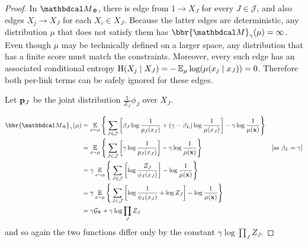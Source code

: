 \begin{proof}
	In $\PDGof{\Phi}$, there is edge from $1 \to X_J$ for every $J \in \mathcal J$, and also edges $X_j \to X_J$ for each $X_i \in X_J$. Because the latter edges are deterministic, any distribution $\mu$ that does not satisfy them has $\bbr{\dg M}_\gamma(\mu) = \infty$. Even though $\mu$ may be technically defined on a larger space, any distribution that has a finite score must match the constraints. Moreover, every such edge has an associated conditional entropy $\operatorname{\mathrm{H}}(X_j \mid X_J) = -\operatorname*{\mathbb{E}}_\mu\log(\mu(x_j \mid x_J)) = 0$. Therefore both per-link terms can be safely ignored for these edges.

	Let $\mathbf{p}_J$ be the joint distribution $\frac{1}{Z_J}\phi_J$ over $X_J$.

	\begin{align*}
	\bbr{\PDGof{\Phi}}_\gamma(\mu) &= \E_{ x \sim \mu} \Bigg\{   \sum_{ J \in \mathcal J } \left[
		\beta_J \log \frac{1}{ p_J(x_J) } + (\gamma - \beta_L ) \log \frac{1}{\mu(x_J)} \right] - \gamma \log \frac{1}{\mu(\mat x)} \Bigg\} \\
		&= \E_{ x \sim \mu} \Bigg\{  \sum_{ J \in \mathcal J }\left[
			\gamma \log \frac{1}{p_J(x_J)}  \right] - \gamma \log \frac{1}{\mu(\mat x)} \Bigg\} 
					&\text{[as $\beta_L = \gamma$]}\\
		&= \gamma \E_{x \sim \mu} \Bigg\{  \sum_{ J \in \mathcal J } \left[
			\log \frac{Z_J}{\phi_J(x_J)}  \right] -\log \frac{1}{\mu(\mat x)} \Bigg\} \\
		&= \gamma \E_{x \sim \mu} \Bigg\{  \sum_{ J \in \mathcal J } \left[
			\log \frac{1}{\phi_J(x_J)} + \log Z_J \right]  - \log \frac{1}{\mu(\mat x)} \Bigg\} \\
		&= \gamma \mathcal G_{\Phi} + \gamma \log \prod_{J} Z_J
	\end{align*}
	and so again the two functions differ only by the constant $\gamma \log \prod_{J} Z_J$.
\end{proof}
